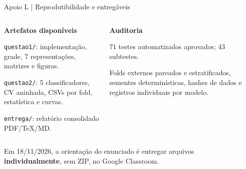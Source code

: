 \documentclass[aspectratio=169,11pt]{beamer}
\begin{document}
\begin{frame}[t]{Apoio L | Reprodutibilidade e entregáveis}

\begin{columns}[T,onlytextwidth]
\begin{simplebox}\small\textbf{Artefatos disponíveis}\par\smallskip
\scriptsize \texttt{questao1/}: implementação, grade, 7 representações, matrizes e figuras.\par\smallskip
\scriptsize \texttt{questao2/}: 5 classificadores, CV aninhada, CSVs por fold, estatística e curvas.\par\smallskip
\scriptsize \texttt{entrega/}: relatório consolidado PDF/TeX/MD.
\end{simplebox}
\begin{simplebox}\small\textbf{Auditoria}\par\smallskip
\scriptsize $71$ testes automatizados aprovados; $43$ subtestes.\par\smallskip
\scriptsize Folds externos pareados e estratificados, sementes determinísticas, hashes de dados e registros individuais por modelo.
\end{simplebox}\end{columns}
\vspace{2mm}\begin{alertabox}\scriptsize Em 18/11/2026, a orientação do enunciado é entregar arquivos \textbf{individualmente}, sem ZIP, no Google Classroom.\end{alertabox}

\end{frame}
\end{document}
